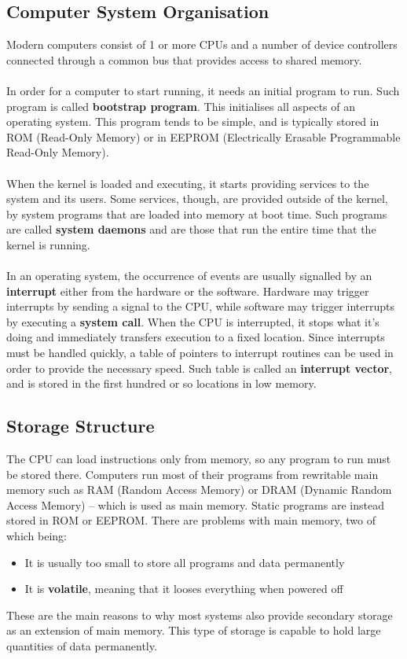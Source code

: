 \documentclass{article}
\begin{document}
\subsection{Computer System Organisation}
Modern computers consist of 1 or more CPUs and a number of device controllers connected through a common bus that provides access to shared memory. \\ \\
In order for a computer to start running, it needs an initial program to run. Such program is called \textbf{bootstrap program}. This initialises all aspects of an operating system. This program tends to be simple, and is typically stored in ROM (Read-Only Memory) or in EEPROM (Electrically Erasable Programmable Read-Only Memory).\\ \\
When the kernel is loaded and executing, it starts providing services to the system and its users. Some services, though, are provided outside of the kernel, by system programs that are loaded into memory at boot time. Such programs are called \textbf{system daemons} and are those that run the entire time that the kernel is running.\\ \\
In an operating system, the occurrence of events are usually signalled by an \textbf{interrupt} either from the hardware or the software. Hardware may trigger interrupts by sending a signal to the CPU, while software may trigger interrupts by executing a \textbf{system call}. When the CPU is interrupted, it stops what it's doing and immediately transfers execution to a fixed location. Since interrupts must be handled quickly, a table of pointers to interrupt routines can be used in order to provide the necessary speed. Such table is called an \textbf{interrupt vector}, and is stored in the first hundred or so locations in low memory.

\subsection{Storage Structure}
The CPU can load instructions only from memory, so any program to run must be stored there. Computers run most of their programs from rewritable main memory such as RAM (Random Access Memory) or DRAM (Dynamic Random Access Memory) -- which is used as main memory. Static programs are instead stored in ROM or EEPROM. There are problems with main memory, two of which being:

\begin{itemize}
	\item It is usually too small to store all programs and data permanently
	\item It is \textbf{volatile}, meaning that it looses everything when powered off
\end{itemize}
These are the main reasons to why most systems also provide secondary storage as an extension of main memory. This type of storage is capable to hold large quantities of data permanently.
\end{document}
